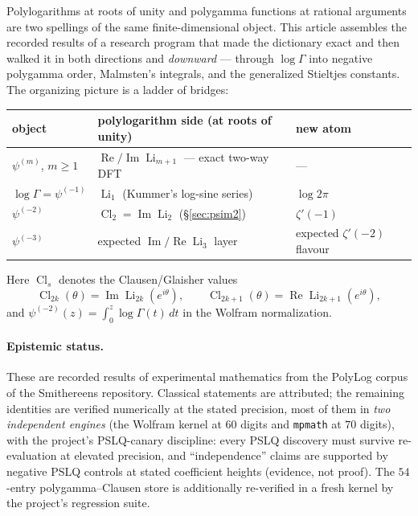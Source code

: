 \documentclass[11pt]{article}
\theoremstyle{remark}
\newcommand{\Li}{\operatorname{Li}}
\newcommand{\Cl}{\operatorname{Cl}}
\begin{document}
Polylogarithms at roots of unity and polygamma functions at rational arguments are two
spellings of the same finite-dimensional object. This article assembles the recorded
results of a research program that made the dictionary exact and then walked it in both
directions and \emph{downward} --- through $\log\Gamma$ into negative polygamma order,
Malmsten's integrals, and the generalized Stieltjes constants. The organizing picture is a
ladder of bridges:

\begin{center}
\small
\begin{tabular}{lll}
\toprule
object & polylogarithm side (at roots of unity) & new atom\\
\midrule
$\psi^{(m)}$, $m\ge1$ & $\operatorname{Re}/\operatorname{Im}\Li_{m+1}$ --- exact two-way DFT & ---\\
$\log\Gamma=\psi^{(-1)}$ & $\Li_1$ (Kummer's log-sine series) & $\log 2\pi$\\
$\psi^{(-2)}$ & $\Cl_2=\operatorname{Im}\Li_2$ (\S\ref{sec:psim2}) & $\zeta'(-1)$\\
$\psi^{(-3)}$ & expected $\operatorname{Im}/\operatorname{Re}\Li_3$ layer & expected $\zeta'(-2)$ flavour\\
\bottomrule
\end{tabular}
\end{center}

Here $\Cl_s$ denotes the Clausen/Glaisher values
\[
\Cl_{2k}(\theta)=\operatorname{Im}\Li_{2k}(e^{i\theta}),\qquad
\Cl_{2k+1}(\theta)=\operatorname{Re}\Li_{2k+1}(e^{i\theta}),
\]
and $\psi^{(-2)}(z)=\int_0^z\log\Gamma(t)\,dt$ in the Wolfram normalization.

\paragraph{Epistemic status.}
These are recorded results of experimental mathematics from the PolyLog corpus of the
Smithereens repository. Classical statements are attributed; the remaining identities are
verified numerically at the stated precision, most of them in \emph{two independent
engines} (the Wolfram kernel at $60$ digits and \texttt{mpmath} at $70$ digits), with the
project's PSLQ-canary discipline: every PSLQ discovery must survive re-evaluation at
elevated precision, and ``independence'' claims are supported by negative PSLQ controls at
stated coefficient heights (evidence, not proof). The $54$-entry polygamma--Clausen store is
additionally re-verified in a fresh kernel by the project's regression suite.
\end{document}

